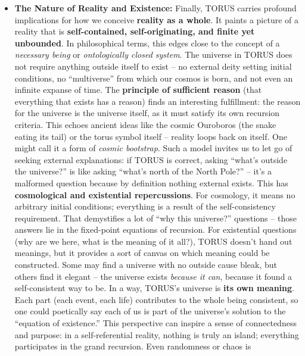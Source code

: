 \documentclass[
]{article}
\begin{document}
{\begin{itemize}
  Thus, TORUS might ultimately contribute to demystifying consciousness,
  showing it as \textbf{the inner aspect of recursive physics}.
\item
  \textbf{The Nature of Reality and Existence:} Finally, TORUS carries
  profound implications for how we conceive \textbf{reality as a whole}.
  It paints a picture of a reality that is \textbf{self-contained,
  self-originating, and finite yet unbounded}. In philosophical terms,
  this edges close to the concept of a \emph{necessary being} or
  \emph{ontologically closed system}. The universe in TORUS does not
  require anything outside itself to exist -- no external deity setting
  initial conditions, no ``multiverse'' from which our cosmos is born,
  and not even an infinite expanse of time. The \textbf{principle of
  sufficient reason} (that everything that exists has a reason) finds an
  interesting fulfillment: the reason for the universe is the universe
  itself, as it must satisfy its own recursion criteria. This echoes
  ancient ideas like the cosmic Ouroboros (the snake eating its tail) or
  the torus symbol itself -- reality loops back on itself. One might
  call it a form of \emph{cosmic bootstrap}. Such a model invites us to
  let go of seeking external explanations: if TORUS is correct, asking
  ``what's outside the universe?'' is like asking ``what's north of the
  North Pole?'' -- it's a malformed question because by definition
  nothing external exists. This has \textbf{cosmological and existential
  repercussions}. For cosmology, it means no arbitrary initial
  conditions; everything is a result of the self-consistency
  requirement. That demystifies a lot of ``why this universe?''
  questions -- those answers lie in the fixed-point equations of
  recursion. For existential questions (why are we here, what is the
  meaning of it all?), TORUS doesn't hand out meanings, but it provides
  a sort of canvas on which meaning could be constructed. Some may find
  a universe with no outside cause bleak, but others find it elegant --
  the universe exists \emph{because it can}, because it found a
  self-consistent way to be. In a way, TORUS's universe is \textbf{its
  own meaning}. Each part (each event, each life) contributes to the
  whole being consistent, so one could poetically say each of us is part
  of the universe's solution to the ``equation of existence.'' This
  perspective can inspire a sense of connectedness and purpose: in a
  self-referential reality, nothing is truly an island; everything
  participates in the grand recursion. Even randomness or chaos is

\end{itemize}}
\end{document}
